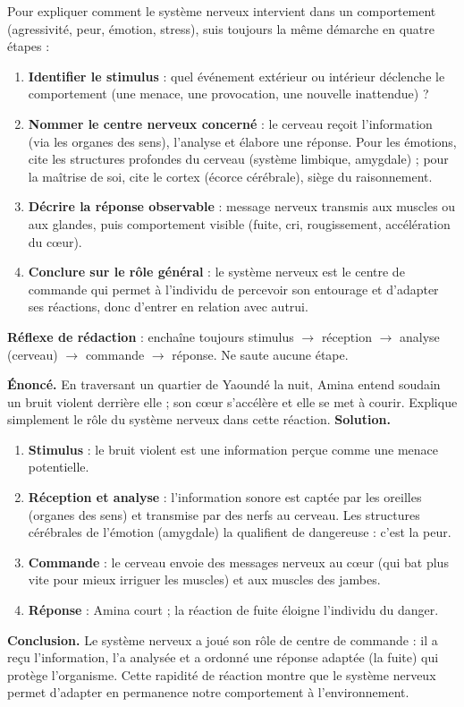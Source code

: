 \documentclass[11pt]{article}
\newcommand{\cle}[1]{{\popxbold\color{popdark}#1}}
\begin{document}
\begin{methode}
Pour expliquer comment le système nerveux intervient dans un comportement (agressivité, peur, émotion, stress), suis toujours la même démarche en quatre étapes :
\begin{enumerate}
\item \textbf{Identifier le stimulus} : quel événement extérieur ou intérieur déclenche le comportement (une menace, une provocation, une nouvelle inattendue) ?
\item \textbf{Nommer le centre nerveux concerné} : le \cle{cerveau} reçoit l'information (via les organes des sens), l'analyse et élabore une réponse. Pour les émotions, cite les \cle{structures profondes du cerveau} (système limbique, amygdale) ; pour la maîtrise de soi, cite le \cle{cortex} (écorce cérébrale), siège du raisonnement.
\item \textbf{Décrire la réponse observable} : message nerveux transmis aux muscles ou aux glandes, puis comportement visible (fuite, cri, rougissement, accélération du cœur).
\item \textbf{Conclure sur le rôle général} : le système nerveux est le \cle{centre de commande} qui permet à l'individu de percevoir son entourage et d'adapter ses réactions, donc d'entrer en relation avec autrui.
\end{enumerate}
\textbf{Réflexe de rédaction} : enchaîne toujours stimulus $\rightarrow$ réception $\rightarrow$ analyse (cerveau) $\rightarrow$ commande $\rightarrow$ réponse. Ne saute aucune étape.
\end{methode}

\begin{exoresolu}
\textbf{Énoncé.} En traversant un quartier de Yaoundé la nuit, Amina entend soudain un bruit violent derrière elle ; son cœur s'accélère et elle se met à courir. Explique simplement le rôle du système nerveux dans cette réaction.
\tcblower
\textbf{Solution.}
\begin{enumerate}
\item \textbf{Stimulus} : le bruit violent est une information perçue comme une menace potentielle.
\item \textbf{Réception et analyse} : l'information sonore est captée par les oreilles (organes des sens) et transmise par des nerfs au \cle{cerveau}. Les structures cérébrales de l'émotion (amygdale) la qualifient de dangereuse : c'est la \cle{peur}.
\item \textbf{Commande} : le cerveau envoie des messages nerveux au cœur (qui bat plus vite pour mieux irriguer les muscles) et aux muscles des jambes.
\item \textbf{Réponse} : Amina court ; la réaction de fuite éloigne l'individu du danger.
\end{enumerate}
\textbf{Conclusion.} Le système nerveux a joué son rôle de centre de commande : il a reçu l'information, l'a analysée et a ordonné une réponse adaptée (la fuite) qui protège l'organisme. Cette rapidité de réaction montre que le système nerveux permet d'adapter en permanence notre comportement à l'environnement.
\end{exoresolu}
\end{document}

